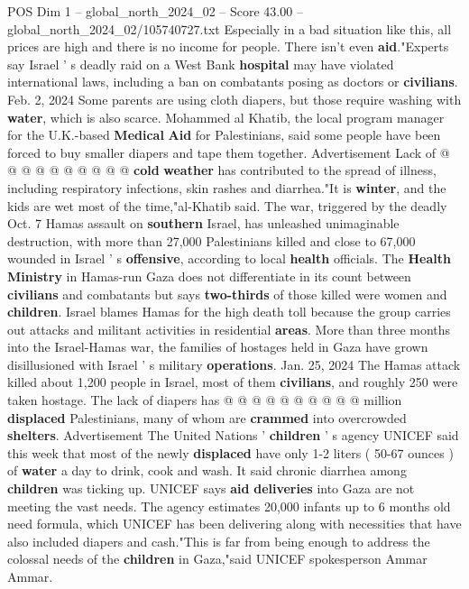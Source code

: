 \begin{textsample}{POS Dim 1 – global\_north\_2024\_02 – Score 43.00 – global\_north\_2024\_02/105740727.txt}
Especially in a bad situation like this, all prices are high and there is no income for people.
There isn't even \textbf{aid}."Experts say Israel ' s deadly raid on a West Bank \textbf{hospital} may have violated international laws, including a ban on combatants posing as doctors or \textbf{civilians}.
Feb. 2, 2024 Some parents are using cloth diapers, but those require washing with \textbf{water}, which is also scarce.
Mohammed al Khatib, the local program manager for the U.K.-based \textbf{Medical} \textbf{Aid} for Palestinians, said some people have been forced to buy smaller diapers and tape them together.
Advertisement Lack of @ @ @ @ @ @ @ @ @ @ \textbf{cold} \textbf{weather} has contributed to the spread of illness, including respiratory infections, skin rashes and diarrhea."It is \textbf{winter}, and the kids are wet most of the time,"al-Khatib said.
The war, triggered by the deadly Oct. 7 Hamas assault on \textbf{southern} Israel, has unleashed unimaginable destruction, with more than 27,000 Palestinians killed and close to 67,000 wounded in Israel ' s \textbf{offensive}, according to local \textbf{health} officials.
The \textbf{Health} \textbf{Ministry} in Hamas-run Gaza does not differentiate in its count between \textbf{civilians} and combatants but says \textbf{two-thirds} of those killed were women and \textbf{children}.
Israel blames Hamas for the high death toll because the group carries out attacks and militant activities in residential \textbf{areas}.
More than three months into the Israel-Hamas war, the families of hostages held in Gaza have grown disillusioned with Israel ' s military \textbf{operations}.
Jan. 25, 2024 The Hamas attack killed about 1,200 people in Israel, most of them \textbf{civilians}, and roughly 250 were taken hostage.
The lack of diapers has @ @ @ @ @ @ @ @ @ @ million \textbf{displaced} Palestinians, many of whom are \textbf{crammed} into overcrowded \textbf{shelters}.
Advertisement The United Nations ' \textbf{children} ' s agency UNICEF said this week that most of the newly \textbf{displaced} have only 1-2 liters ( 50-67 ounces ) of \textbf{water} a day to drink, cook and wash.
It said chronic diarrhea among \textbf{children} was ticking up.
UNICEF says \textbf{aid} \textbf{deliveries} into Gaza are not meeting the vast needs.
The agency estimates 20,000 infants up to 6 months old need formula, which UNICEF has been delivering along with necessities that have also included diapers and cash."This is far from being enough to address the colossal needs of the \textbf{children} in Gaza,"said UNICEF spokesperson Ammar Ammar.

\end{textsample}
